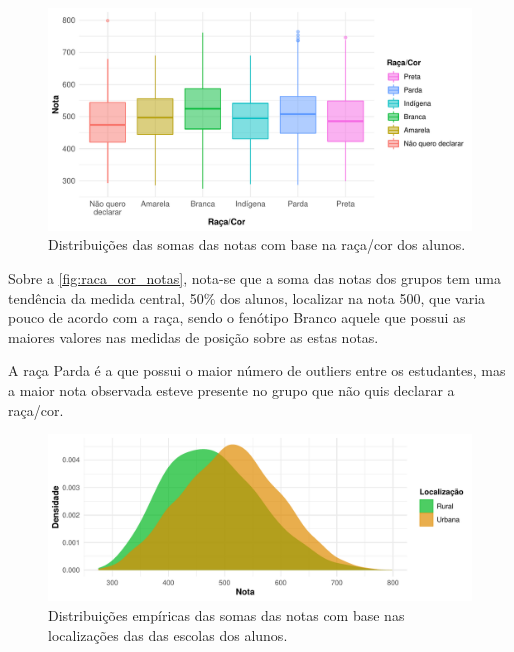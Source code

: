 \begin{figure}[h]
    \caption{Distribuições das somas das notas com base na raça/cor dos alunos.\label{fig:raca_cor_notas}}
    \begin{center}
        \includegraphics[width=16cm]{img/raca_cor_notas.pdf}
    \end{center}
\end{figure}
Sobre a \autoref{fig:raca_cor_notas}, nota-se que a soma das notas dos grupos tem uma
tendência da medida central, 50\% dos alunos, localizar na nota 500, que varia pouco de 
acordo com a raça, sendo o fenótipo Branco aquele que possui as maiores valores nas medidas
de posição sobre as estas notas.

A raça Parda é a que possui o maior número de outliers entre os estudantes,
mas a maior nota observada esteve presente no grupo que não quis declarar a raça/cor.

\newpage

\begin{figure}[htb]
    \caption{Distribuições empíricas das somas das notas com base nas localizações das
    das escolas dos alunos.\label{img:loc_notas}}
    \begin{center}
        \includegraphics[width=16cm]{img/loc_notas.pdf}
    \end{center}
\end{figure}


